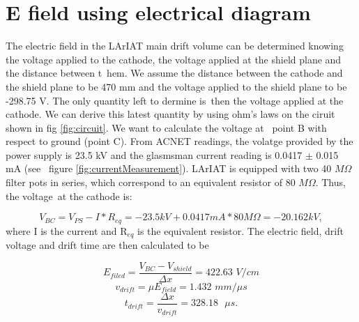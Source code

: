 \clearpage
\newpage
\section{E field using electrical diagram}\label{sec:elDiagram}
The electric field in the LArIAT main drift volume can be determined knowing the voltage applied to the cathode, the voltage applied at the shield plane and the distance between t\
hem. We assume the distance between the cathode and the shield plane to be 470 mm and the voltage applied to the shield plane to be -298.75 V. The only quantity left to dermine is\
 then the voltage applied at the cathode. We can derive this latest quantity by using ohm's laws on the ciruit shown in fig \ref{fig:circuit}. We want to calculate the voltage at \
point B with respect to ground (point C). From ACNET readings, the volatge provided by the power supply is 23.5 kV and the glasmsman current reading is 0.0417 $\pm$ 0.015 mA (see \
figure \ref{fig:currentMeasurement}). LArIAT is equipped with two 40 $M\Omega$ filter pots in series, which correspond to an equivalent resistor of 80 $M\Omega$. Thus, the voltage\
 at the cathode is:

\begin{equation} V_{BC}=V_{PS} - I*R_{eq} = -23.5kV + 0.0417mA*80M\Omega = -20.162 kV, \label{eq:VBC}
\end{equation}
where I is the current and R$_{eq}$ is the equivalent resistor.
The electric field, drift voltage and drift time are then calculated to be

\begin{equation}E_{filed} = \frac{V_{BC} - V_{shield}}{\Delta x} = 422.63 \textit{ V/cm}
\end{equation}
\begin{equation}v_{drift} = \mu E_{field} = 1.432 \textit{ mm/$\mu$s}
\end{equation}
\begin{equation}t_{drift} = \frac{\Delta x}{v_{drift}} = 328.18 \textit{ $\mu$s.}
\end{equation}

